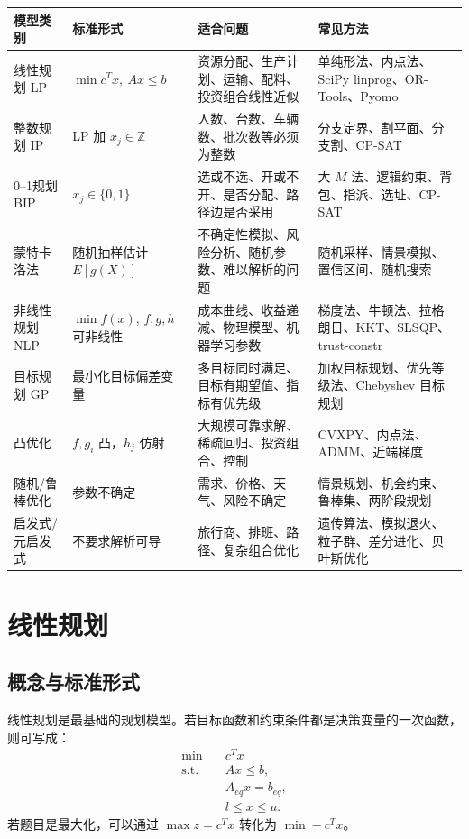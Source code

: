 \documentclass[11pt,a4paper]{ctexart}
\newcommand{\Z}{\mathbb{Z}}
\begin{document}
\begin{longtable}{p{2.4cm}p{3.2cm}p{4.8cm}p{4.3cm}}
\toprule
模型类别 & 标准形式 & 适合问题 & 常见方法 \\
\midrule
线性规划 LP & $\min c^Tx,\ Ax\le b$ & 资源分配、生产计划、运输、配料、投资组合线性近似 & 单纯形法、内点法、SciPy linprog、OR-Tools、Pyomo \\
整数规划 IP & LP 加 $x_j\in\Z$ & 人数、台数、车辆数、批次数等必须为整数 & 分支定界、割平面、分支割、CP-SAT \\
0--1规划 BIP & $x_j\in\{0,1\}$ & 选或不选、开或不开、是否分配、路径边是否采用 & 大 $M$ 法、逻辑约束、背包、指派、选址、CP-SAT \\
蒙特卡洛法 & 随机抽样估计 $E[g(X)]$ & 不确定性模拟、风险分析、随机参数、难以解析的问题 & 随机采样、情景模拟、置信区间、随机搜索 \\
非线性规划 NLP & $\min f(x)$, $f,g,h$ 可非线性 & 成本曲线、收益递减、物理模型、机器学习参数 & 梯度法、牛顿法、拉格朗日、KKT、SLSQP、trust-constr \\
目标规划 GP & 最小化目标偏差变量 & 多目标同时满足、目标有期望值、指标有优先级 & 加权目标规划、优先等级法、Chebyshev 目标规划 \\
凸优化 & $f,g_i$ 凸，$h_j$ 仿射 & 大规模可靠求解、稀疏回归、投资组合、控制 & CVXPY、内点法、ADMM、近端梯度 \\
随机/鲁棒优化 & 参数不确定 & 需求、价格、天气、风险不确定 & 情景规划、机会约束、鲁棒集、两阶段规划 \\
启发式/元启发式 & 不要求解析可导 & 旅行商、排班、路径、复杂组合优化 & 遗传算法、模拟退火、粒子群、差分进化、贝叶斯优化 \\
\bottomrule
\end{longtable}

\section{线性规划}

\subsection{概念与标准形式}
线性规划是最基础的规划模型。若目标函数和约束条件都是决策变量的一次函数，则可写成：
\begin{equation}
\begin{aligned}
\min\quad & c^Tx\\
\text{s.t.}\quad & Ax\le b,\\
& A_{eq}x=b_{eq},\\
& l\le x\le u.
\end{aligned}
\end{equation}
若题目是最大化，可以通过 $\max z= c^Tx$ 转化为 $\min -c^Tx$。
\end{document}
